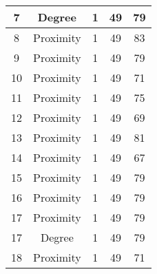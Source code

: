 \documentclass[results.tex]{subfiles}
\begin{document}
\begin{center}
\begin{tabular}{| c || c | c | c | c |}
            \hline
            7                       & Degree                       & 1                      & 49                      & 79                   \\
            \hline
            8                       & Proximity                    & 1                      & 49                      & 83                   \\
            \hline
            9                       & Proximity                    & 1                      & 49                      & 79                   \\
            \hline
            10                      & Proximity                    & 1                      & 49                      & 71                   \\
            \hline
            11                      & Proximity                    & 1                      & 49                      & 75                   \\
            \hline
            12                      & Proximity                    & 1                      & 49                      & 69                   \\
            \hline
            13                      & Proximity                    & 1                      & 49                      & 81                   \\
            \hline
            14                      & Proximity                    & 1                      & 49                      & 67                   \\
            \hline
            15                      & Proximity                    & 1                      & 49                      & 79                   \\
            \hline
            16                      & Proximity                    & 1                      & 49                      & 79                   \\
            \hline
            17                      & Proximity                    & 1                      & 49                      & 79                   \\
            \hline
            17                      & Degree                       & 1                      & 49                      & 79                   \\
            \hline
            18                      & Proximity                    & 1                      & 49                      & 71                   \\

\end{tabular}
\end{center}
\end{document}
